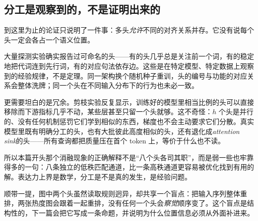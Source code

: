 \subsection{分工是观察到的，不是证明出来的}

到这里为止的论证只说明了一件事：多头\emph{允许}不同的对齐关系并存。它没有说每个头一定会各占一个语义位置。

大量探测实验确实报告过可命名的头——有的头几乎总是关注前一个词，有的稳定地把代词连到先行词，有的对应句法依存边。这些是在特定模型、特定数据上观察到的经验规律，不是定理。同一架构换个随机种子重训，头的编号与功能的对应关系会整体洗牌；同一个头在不同输入分布下的行为也未必一致。

更需要坦白的是冗余。剪枝实验反复显示，训练好的模型里相当比例的头可以直接移除而下游指标几乎不动，某些层甚至只留一个头就够。这不奇怪：\(h\) 个头是并行的、没有任何机制惩罚它们学到相似的东西，梯度也不会主动要求它们分散。真实模型里既有明确分工的头，也有大批彼此高度相似的头，还有退化成\emph{attention sink}的头——所有查询都把质量压在首个 token 上，等价于什么也不读。

所以本篇开头那个消融现象的正确解释不是``八个头各司其职''，而是弱一些也牢靠得多的一句：八条独立的低秩匹配通道，比一条高秩通道更容易被优化找到有用的解。表达力上界是数学，分工是不是真的发生，是经验问题。

顺带一提，图中两个头虽然读取规则迥异，却共享一个盲点：把输入序列整体重排，两张热度图会跟着一起重排，没有任何一个头会\emph{察觉}顺序变了。这个盲点是结构性的，下一篇会把它写成一条命题，并说明为什么位置信息必须从外面补进来。
